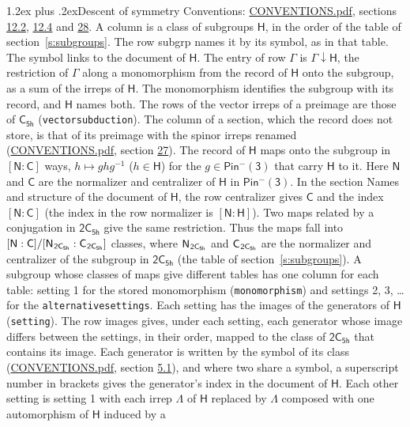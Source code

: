 \documentclass[10pt,a4paper]{article}
\makeatletter
\renewcommand\section{\@startsection{section}{1}{\z@}{-3ex plus -1ex minus -.2ex}%
  {1.2ex plus .2ex}{\normalfont\large\sffamily\bfseries\color{parttitle}}}
\numberwithin{equation}{section}
\newcommand{\grp}[1]{\mathsf{#1}}
\newcommand{\grpindex}[2]{[#1 : #2]}
\newcommand{\restr}[2]{#1\!\downarrow#2}
\newcommand{\hairsp}{\mkern1mu}
\makeatother
\begin{document}
\section{Descent of symmetry}\label{s:subduction}
Conventions: \href{../../CONVENTIONS.pdf}{CONVENTIONS.pdf}, sections \href{../../../rotation/CONVENTIONS.pdf\#conv.12.2}{12.2}, \href{../../../rotation/CONVENTIONS.pdf\#conv.12.4}{12.4} and \href{../../CONVENTIONS.pdf\#conv.28}{28}.
A column is a class of subgroups $\grp{H}$, in the order of the table of section~\ref{s:subgroups}. The row subgrp names it by its symbol, as in that table. The symbol links to the document of $\grp{H}$. The entry of row $\Gamma$ is $\restr{\Gamma}{\grp{H}}$, the restriction of $\Gamma$ along a monomorphism from the record of $\grp{H}$ onto the subgroup, as a sum of the irreps of $\grp{H}$. The monomorphism identifies the subgroup with its record, and $\grp{H}$ names both. The rows of the vector irreps of a preimage are those of \href{../../../rotation/data/pdf/C5h.pdf}{$\grp{C_{5h}}$} (\texttt{vectorsubduction}). The column of a section, which the record does not store, is that of its preimage with the spinor irreps renamed (\href{../../CONVENTIONS.pdf}{CONVENTIONS.pdf}, section \href{../../CONVENTIONS.pdf\#conv.27}{27}). \label{n:group.normalizer.o3}\label{n:group.centralizer.o3}\label{n:element.h}The record of $\grp{H}$ maps onto the subgroup in $\grpindex{\grp{N}}{\grp{C}}$ ways, $h \mapsto g h g^{-1}$ ($h \in \grp{H}$) for the $g \in \grp{Pin^{-}(3)}$ that carry $\grp{H}$ to it. Here $\grp{N}$ and $\grp{C}$ are the normalizer and centralizer of $\grp{H}$ in \href{Pinminus3.pdf}{$\grp{Pin^{-}(3)}$}. In the section Names and structure of the document of $\grp{H}$, the row centralizer gives $\grp{C}$ and the index $\grpindex{\grp{N}}{\grp{C}}$ (the index in the row normalizer is $\grpindex{\grp{N}}{\grp{H}}$). Two maps related by a conjugation in $\grp{2C_{5h}}$ give the same restriction. Thus the maps fall into $\grpindex{\grp{N}}{\grp{C}}/\grpindex{\grp{N}_{\hairsp \grp{2C_{5h}}}}{\grp{C}_{\hairsp \grp{2C_{5h}}}}$ classes, where $\grp{N}_{\hairsp \grp{2C_{5h}}}$ and $\grp{C}_{\hairsp \grp{2C_{5h}}}$ are the normalizer and centralizer of the subgroup in $\grp{2C_{5h}}$ (the table of section~\ref{s:subgroups}). \label{n:head.setting}A subgroup whose classes of maps give different tables has one column for each table: setting 1 for the stored monomorphism (\texttt{monomorphism}) and settings 2, 3, \dots{} for the \texttt{alternativesettings}. Each setting has the images of the generators of $\grp{H}$ (\texttt{setting}). \label{n:head.images}The row images gives, under each setting, each generator whose image differs between the settings, in their order, mapped to the class of $\grp{2C_{5h}}$ that contains its image. Each generator is written by the symbol of its class (\href{../../CONVENTIONS.pdf}{CONVENTIONS.pdf}, section \href{../../../rotation/CONVENTIONS.pdf\#conv.5.1}{5.1}), and where two share a symbol, a superscript number in brackets gives the generator's index in the document of $\grp{H}$. \label{n:irrep.Delta}Each other setting is setting 1 with each irrep $\Lambda$ of $\grp{H}$ replaced by $\Lambda$ composed with one automorphism of $\grp{H}$ induced by a 
\end{document}
